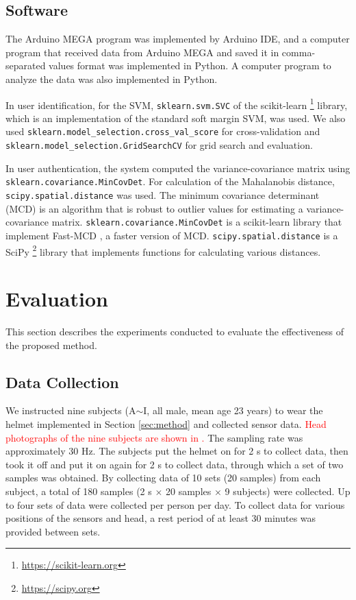 \documentclass[english,preprint,JIP]{ipsj}
\begin{document}
\subsection{Software}
The Arduino MEGA program was implemented by Arduino IDE, and a computer program that received data from Arduino MEGA and saved it in comma-separated values format was implemented in Python. A computer program to analyze the data was also implemented in Python.\par

In user identification, for the SVM, \texttt{sklearn.svm.SVC} of the scikit-learn \footnote{\url{https://scikit-learn.org}} library, which is an implementation of the standard soft margin SVM, was used. We also used \texttt{sklearn.model\_selection.cross\_val\_score} for cross-validation and \texttt{sklearn.model\_selection.GridSearchCV} for grid search and evaluation.\par

In user authentication, the system computed the variance-covariance matrix using \texttt{sklearn.covariance.MinCovDet}. For calculation of the Mahalanobis distance, \texttt{scipy.spatial.distance} was used. The minimum covariance determinant (MCD) is an algorithm that is robust to outlier values for estimating a variance-covariance matrix. \texttt{sklearn.covariance.MinCovDet} is a scikit-learn library that implement Fast-MCD \cite{fast_mcd}, a faster version of MCD. \texttt{scipy.spatial.distance} is a SciPy \footnote{\url{https://scipy.org}} library that implements functions for calculating various distances.



\section{Evaluation}
\label{sec:evaluation}
This section describes the experiments conducted to evaluate the effectiveness of the proposed method.


\subsection{Data Collection}
We instructed nine subjects (A$\sim$I, all male, mean age 23 years) to wear the helmet implemented in Section \ref{sec:method} and collected sensor data. \textcolor{red}{Head photographs of the nine subjects are shown in .} The sampling rate was approximately 30 Hz. The subjects put the helmet on for 2 s to collect data, then took it off and put it on again for 2 s to collect data, through which a set of two samples was obtained. By collecting data of 10 sets (20 samples) from each subject, a total of 180 samples (2 s $\times$ 20 samples $\times$ 9 subjects) were collected. Up to four sets of data were collected per person per day. To collect data for various positions of the sensors and head, a rest period of at least 30 minutes was provided between sets.
\end{document}
